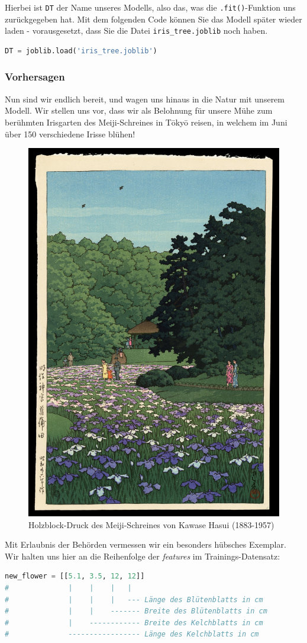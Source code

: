 \begin{lpu}
Hierbei ist \texttt{DT} der Name unseres Modells, also das, was die \texttt{.fit()}-Funktion uns zurückgegeben hat. Mit dem folgenden Code können Sie das Modell später wieder laden - vorausgesetzt, dass Sie die Datei \texttt{iris\_tree.joblib} noch haben.

\begin{lstlisting}[language=Python]
DT = joblib.load('iris_tree.joblib')
\end{lstlisting}

\subsubsection*{Vorhersagen}
Nun sind wir endlich bereit, und wagen uns hinaus in die Natur mit unserem Modell. Wir stellen uns vor, dass wir als Belohnung für unsere Mühe zum berühmten Irisgarten des Meiji-Schreines in Tōkyō reisen, in welchem im Juni über 150 verschiedene Irisse blühen! 

\begin{figure}
\begin{center}
  \includegraphics[width=0.5\linewidth]{irisgarden.jpg}
  \caption{Holzblock-Druck des Meiji-Schreines von Kawase Hasui (1883-1957)}
\end{center}
\end{figure}

Mit Erlaubnis der Behörden vermessen wir ein besonders hübsches Exemplar. Wir halten uns hier an die Reihenfolge der \textit{features} im Trainings-Datensatz:

\begin{lstlisting}[language=Python]
new_flower = [[5.1, 3.5, 12, 12]]
#              |    |    |   |
#              |    |    |   --- Länge des Blütenblatts in cm
#              |    |    ------- Breite des Blütenblatts in cm
#              |    ------------ Breite des Kelchblatts in cm
#              ----------------- Länge des Kelchblatts in cm
\end{lstlisting}


\end{lpu}
